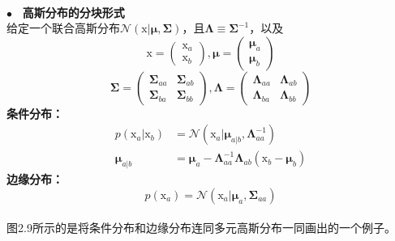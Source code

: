 \documentclass[b5paper]{book}
\numberwithin{equation}{chapter}
\newcommand {\bx} {\boldsymbol{\mathrm{x}}}
\newcommand {\bfMu} {\boldsymbol{\mu}}
\newcommand {\bfSigma} {\boldsymbol{\Sigma}}
\newcommand {\bfLambda} {\boldsymbol{\Lambda}}
\newcommand {\insertline} {\noindent{\color{red} \rule[5pt]{\textwidth}{0.1em}}}
\begin{document}
{	\insertline \\
	\color{red} $\bullet$ \textbf{\ 高斯分布的分块形式}　\color{black} \\
	\indent 给定一个联合高斯分布$\mathcal{N}(\bx|\bfMu,\bfSigma)$，且$\bfLambda \equiv \bfSigma^{-1}$，以及
	\begin{equation}
		\bx=\left(\begin{matrix} \bx_a \\ \bx_b \end{matrix} \right), \bfMu=\left(\begin{matrix}\bfMu_a \\ \bfMu_b\end{matrix}\right)
	\end{equation}
	\begin{equation}
		\bfSigma=\left(\begin{matrix}
			\bfSigma_{aa} & \bfSigma_{ab} \\
			\bfSigma_{ba} & \bfSigma_{bb}
		\end{matrix}\right), \bfLambda=\left(\begin{matrix}
			\bfLambda_{aa} & \bfLambda_{ab} \\
			\bfLambda_{ba} & \bfLambda_{bb}
		\end{matrix}\right)
	\end{equation}
	\indent \textbf{条件分布：}
	\begin{align}
		p(\bx_a|\bx_b) &= \mathcal{N}(\bx_a|\bfMu_{a|b},\bfLambda_{aa}^{-1}) \\
		\bfMu_{a|b} &= \bfMu_a-\bfLambda_{aa}^{-1}\bfLambda_{ab}(\bx_b-\bfMu_b)
	\end{align}
	\indent \textbf{边缘分布：}
	\begin{equation}
		p(\bx_a)=\mathcal{N}(\bx_a|\bfMu_a,\bfSigma_{aa})
	\end{equation}
	\insertline \\
	\indent 图2.9所示的是将条件分布和边缘分布连同多元高斯分布一同画出的一个例子。
	\begin{figure}[ht]
		\begin{minipage}[t]{0.5\linewidth}
		\centering

\end{minipage}
\end{figure}}
\end{document}

